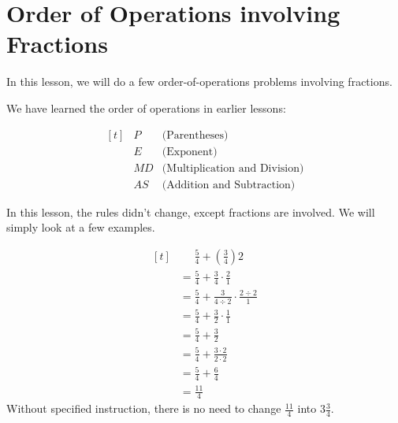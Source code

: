 
\section{Order of Operations involving Fractions}

In this lesson, we will do a few order-of-operations problems involving fractions.

We have learned the order of operations in earlier lessons:

\[
\begin{aligned}[t]
   &P &\text{(Parentheses)} \\
   &E &\text{(Exponent)} \\
   &MD &\text{(Multiplication and Division)} \\
   &AS &\text{(Addition and Subtraction)}
\end{aligned}
\]
\label{fig:PEMDAS38}

In this lesson, the rules didn't change, except fractions are involved. We will simply look at a few examples.

\begin{myexample}
\[
\begin{aligned}[t]
	&\phantom{{}=} \frac{5}{4}+(\frac{3}{4})2 \\
	&= \frac{5}{4}+\frac{3}{4} \cdot \frac{2}{1} \\
	&= \frac{5}{4}+\frac{3}{4\div2} \cdot \frac{2\div2}{1} \\
	&= \frac{5}{4}+\frac{3}{2} \cdot \frac{1}{1} \\
   	&= \frac{5}{4}+\frac{3}{2} \\
   	&= \frac{5}{4}+\frac{3\cdot2}{2\cdot2} \\
   	&= \frac{5}{4}+\frac{6}{4} \\
	&= \frac{11}{4}
\end{aligned}
\]
Without specified instruction, there is no need to change $\frac{11}{4}$ into $3\frac{3}{4}$.
\end{myexample}

